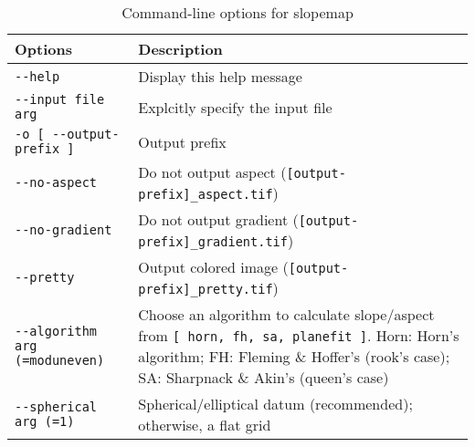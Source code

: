 \begin{longtable}{|l|p{11cm}|} 
\caption{Command-line options for slopemap}
\label{tbl:slopemap}
\endfirsthead
\endhead
\endfoot
\endlastfoot
\hline
Options & Description\\ \hline \hline
\verb#--help# & Display this help message\\ \hline
\verb#--input file arg# & Explcitly specify the input file\\ \hline
\verb#-o [ --output-prefix ]# & Output prefix\\ \hline
\verb#--no-aspect# & Do not output aspect (\verb#[output-prefix]_aspect.tif#)\\ \hline
\verb#--no-gradient# & Do not output gradient (\verb#[output-prefix]_gradient.tif#)\\ \hline
\verb#--pretty# & Output colored image (\verb#[output-prefix]_pretty.tif#)\\ \hline
\verb#--algorithm arg (=moduneven)# & Choose an algorithm to calculate slope/aspect from \verb#[ horn, fh, sa, planefit ]#. Horn: Horn's algorithm; FH: Fleming \& Hoffer's (rook's case); SA: Sharpnack \& Akin's (queen's case)\\ \hline
\verb#--spherical arg (=1)# & Spherical/elliptical datum (recommended); otherwise, a flat grid\\ \hline
\end{longtable}

